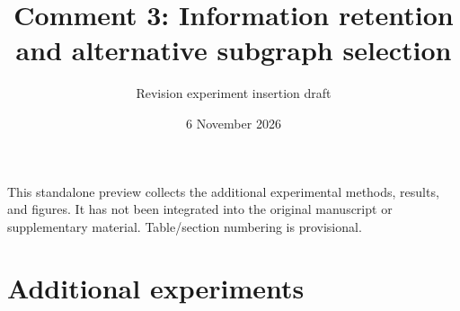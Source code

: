 \documentclass[10pt,a4paper]{article}
\title{Comment 3: Information retention and alternative subgraph selection}
\author{Revision experiment insertion draft}
\date{6 November 2026}
\begin{document}
\maketitle
\noindent This standalone preview collects the additional experimental methods,
results, and figures. It has not been integrated into the original manuscript
or supplementary material. Table/section numbering is provisional.
\section{Additional experiments}



\end{document}
